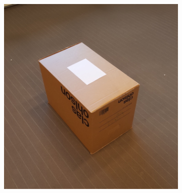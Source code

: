 \begin{figure}
\begin{subfigure}[b]{0.2\textwidth}
		\label{fig:angle_2}
	\end{subfigure}
	~
	\begin{subfigure}[b]{0.2\textwidth}
		\includegraphics[width=\textwidth]{figures/angle_3.jpg}
		\label{fig:angle_3}
	\end{subfigure}
	

\end{figure}
